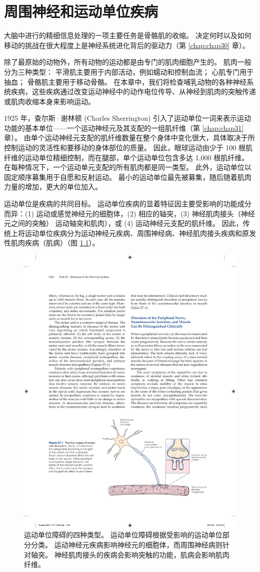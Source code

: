 \chapter{周围神经和运动单位疾病} \label{chap:chap57}
大脑中进行的精细信息处理的一项主要任务是骨骼肌的收缩。 决定何时以及如何移动的挑战在很大程度上是神经系统进化背后的驱动力（第 \ref{chap:chap30} 章）。

除了最原始的动物外，所有动物的运动都是由专门的肌肉细胞产生的。 肌肉一般分为三种类型： 平滑肌主要用于内部活动，例如蠕动和控制血流； 心肌专门用于抽血； 骨骼肌主要用于移动骨骼。 在本章中，我们将检查哺乳动物的各种神经系统疾病，这些疾病通过改变运动神经中的动作电位传导、从神经到肌肉的突触传递或肌肉收缩本身来影响运动。

1925 年，查尔斯·谢林顿 (Charles Sherrington) 引入了运动单位一词来表示运动功能的基本单位——一个运动神经元及其支配的一组肌纤维（第 \ref{chap:chap31} 章）。 由单个运动神经元支配的肌纤维数量在整个身体中变化很大，具体取决于所控制运动的灵活性和要移动的身体部位的质量。 因此，眼球运动由少于 100 根肌纤维的运动单位精细控制，而在腿部，单个运动单位包含多达 1,000 根肌纤维。 在每种情况下，一个运动单元支配的所有肌肉都是同一类型。 此外，运动单位以固定顺序募集用于自愿和反射运动。 最小的运动单位最先被募集，随后随着肌肉力量的增加，更大的单位加入。

运动单位是疾病的共同目标。 运动单位疾病的显着特征因主要受影响的功能成分而异：(1) 运动或感觉神经元的细胞体，(2) 相应的轴突，(3) 神经肌肉接头（神经元之间的突触） 运动轴突和肌肉），或 (4) 运动神经元支配的肌纤维。 因此，传统上将运动单位疾病分为运动神经元疾病、周围神经病、神经肌肉接头疾病和原发性肌肉疾病（肌病）（图 \ref{fig:57_1}）。

\begin{figure}[htbp]
	\centering
	\includegraphics[width=0.7\linewidth]{chap57/fig_57_1}
	\caption{运动单位障碍的四种类型。 运动单位障碍根据受影响的运动单位部分分类。 运动神经元疾病影响神经元的细胞体，而周围神经病则针对轴突。 神经肌肉接头的疾病会影响突触的功能，肌病会影响肌肉纤维。}
	\label{fig:57_1}
\end{figure}


